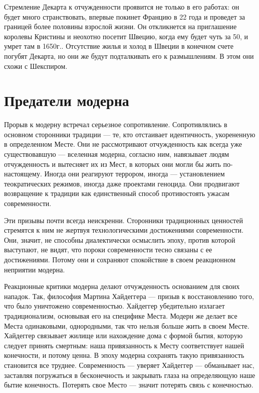 \documentclass[12pt]{book}
\begin{document}
Стремление Декарта к отчужденности проявится не только в его работах: он будет много странствовать, впервые покинет Францию в 22 года и проведет за границей более половины взрослой жизни. Он откликнется на приглашение королевы Кристины и неохотно посетит Швецию, когда ему будет чуть за 50, и умрет там в 1650г.. Отсутствие жилья и холод в Швеции в конечном счете погубят Декарта, но они же будут подталкивать его к размышлениям. В этом они схожи с Шекспиром.

\section{Предатели модерна}

Прорыв к модерну встречал серьезное сопротивление. Сопротивлялись в основном сторонники традиции --- те, кто отстаивает идентичность, укорененную в определенном Месте. Они не рассмотривают отчужденность как всегда уже существовавшую --- вселенная модерна, согласно ним, навязывает людям отчужденность и вытесняет их из Мест, в которых они могли бы жить по-настоящему. Иногда они реагируют террором, иногда --- установлением теократических режимов, иногда даже проектами геноцида. Они продвигают возвращение к традиции как единственный способ противостоять ужасам современности.

Эти призывы почти всегда неискренни. Сторонники традиционных ценностей стремятся к ним не жертвуя технологическими достижениями современности. Они, значит, не способны диалектически осмыслить эпоху, против которой выступают, не видят, что пороки современности тесно связаны с ее достижениями. Потому они и сохраняют спокойствие в своем реакционном неприятии модерна.

Реакционные критики модерна делают отчужденность основанием для своих нападок. Так, философия Мартина Хайдеггера --- призыв к восстановлению того, что было уничтожено современностью. Хайдеггер убедительно излагает традиционализм, основывая его на специфике Места. Модерн же делает все Места одинаковыми, однородными, так что нельзя больше жить в своем Месте. Хайдеггер связывает жилище или нахождение дома с формой бытия, которую следует принять смертным: наша привязанность к Месту соответствует нашей конечности, и потому ценна. В эпоху модерна сохранять такую привязанность становится все труднее. Современность --- уверяет Хайдеггер --- обманывает нас, заставляя погружаться в бесконечность и закрывать глаза на определяющую наше бытие конечность. Потерять свое Место --- значит потерять связь с конечностью.
\end{document}
